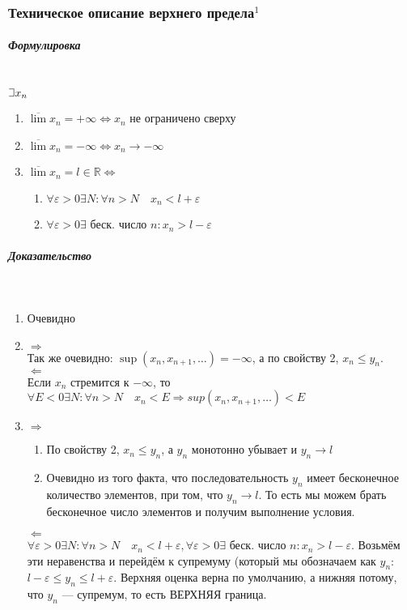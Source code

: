 \documentclass{article}
\def\letus{%
\mathord{\setbox0=\hbox{$\exists$}%
         \hbox{\kern 0.125\wd0%
               \vbox to \ht0{%
                  \hrule width 0.75\wd0%
                  \vfill%
                  \hrule width 0.75\wd0}%
               \vrule height \ht0%
               \kern 0.125\wd0}%
       }%
        }
\let\vanillasubparagraph\subparagraph
\renewcommand{\subparagraph}[1]{\vanillasubparagraph{#1}\mbox{}\\}
\begin{document}
\subsubsection{Техническое описание верхнего предела\texorpdfstring{$^1$}{}}
\label{ТехВерхПредел}
\subparagraph{Формулировка}
$\letus x_n$
\begin{enumerate}
    \item $\overline{\lim} x_n = +\infty \Leftrightarrow x_n$ не ограничено сверху
    \item $\overline{\lim} x_n = -\infty \Leftrightarrow x_n \rightarrow -\infty$
    \item $\overline{\lim} x_n = l \in \mathbb{R} \Leftrightarrow $ \begin{enumerate}
        \item $\forall \varepsilon > 0 \exists N : \forall n > N \quad x_n < l + \varepsilon$
        \item $\forall \varepsilon > 0 \exists$ беск. число $n : x_n > l - \varepsilon$
    \end{enumerate}
\end{enumerate}

\subparagraph{Доказательство}
\begin{enumerate}
    \item Очевидно
    
    \item $\Rightarrow$\\ 
    Так же очевидно: $\sup(x_n, x_{n+1},\ldots) = -\infty$, а по свойству 2, $x_n \le y_n$.\\
    $\Leftarrow$\\
    Если $x_n$ стремится к $-\infty$, то $\forall E < 0 \exists N : \forall n > N \quad x_n < E \Rightarrow sup(x_n, x_{n+1}, \ldots) < E$
    
    \item $\Rightarrow$\\
    \begin{enumerate}
        \item По свойству 2, $x_n \le y_n$, а $y_n$ монотонно убывает и $y_n \rightarrow l$
        \item Очевидно из того факта, что последовательность $y_n$ имеет бесконечное количество элементов, при том, что $y_n \rightarrow l$. То есть мы можем брать бесконечное число элементов и получим выполнение условия.
    \end{enumerate}
    $\Leftarrow$\\
    $\forall \varepsilon > 0 \exists N : \forall n > N \quad x_n < l + \varepsilon, \forall \varepsilon > 0 \exists$ беск. число $n : x_n > l - \varepsilon$. Возьмём эти неравенства и перейдём к супремуму (который мы обозначаем как $y_n$:\\
    $l - \varepsilon \le y_n \le l + \varepsilon$. Верхняя оценка верна по умолчанию, а нижняя потому, что $y_n$ --- супремум, то есть ВЕРХНЯЯ граница.
\end{enumerate}
\end{document}
